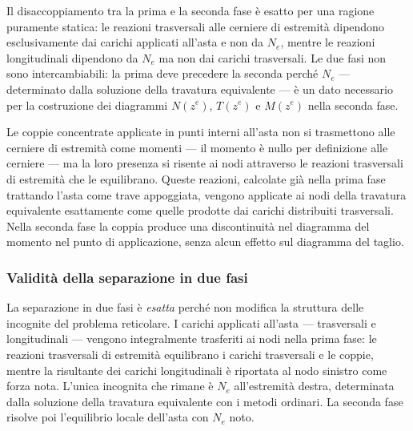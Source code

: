 \begin{oss}
	Il disaccoppiamento tra la prima e la seconda
	fase è esatto per una ragione puramente statica:
	le reazioni trasversali alle cerniere di estremità
	dipendono esclusivamente dai carichi applicati
	all'asta e non da $N_e$, mentre le reazioni
	longitudinali dipendono da $N_e$ ma non dai
	carichi trasversali. Le due fasi non sono
	intercambiabili: la prima deve precedere la
	seconda perché $N_e$ --- determinato dalla
	soluzione della travatura equivalente --- è
	un dato necessario per la costruzione dei
	diagrammi $N(z^e)$, $T(z^e)$ e $M(z^e)$
	nella seconda fase.
\end{oss}

\begin{oss}
	Le coppie concentrate applicate in punti interni
	all'asta non si trasmettono alle cerniere di
	estremità come momenti --- il momento è nullo
	per definizione alle cerniere --- ma la loro
	presenza si risente ai nodi attraverso le
	reazioni trasversali di estremità che le
	equilibrano. Queste reazioni, calcolate già
	nella prima fase trattando l'asta come trave
	appoggiata, vengono applicate ai nodi della
	travatura equivalente esattamente come quelle
	prodotte dai carichi distribuiti trasversali.
	Nella seconda fase la coppia produce una
	discontinuità nel diagramma del momento nel
	punto di applicazione, senza alcun effetto
	sul diagramma del taglio.
\end{oss}

\subsubsection{Validità della separazione in due fasi}
\label{subsec:validita_due_fasi}

La separazione in due fasi è \emph{esatta} perché
non modifica la struttura delle incognite del
problema reticolare. I carichi applicati all'asta
--- trasversali e longitudinali --- vengono
integralmente trasferiti ai nodi nella prima fase:
le reazioni trasversali di estremità equilibrano
i carichi trasversali e le coppie, mentre la
risultante dei carichi longitudinali è riportata
al nodo sinistro come forza nota. L'unica incognita
che rimane è $N_e$ all'estremità destra, determinata
dalla soluzione della travatura equivalente con i
metodi ordinari. La seconda fase risolve poi
l'equilibrio locale dell'asta con $N_e$ noto.



